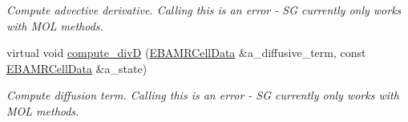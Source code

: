 \begin{DoxyCompactItemize}
\begin{DoxyCompactList}\small\item\em Compute advective derivative. Calling this is an error -\/ SG currently only works with M\+OL methods. \end{DoxyCompactList}\item 
virtual void \hyperlink{classcdr__sg_af01c3d0917c74904d53f73faa6892f57}{compute\+\_\+divD} (\hyperlink{type__definitions_8H_a7e610f301989e5e07781c5e338bdb7c3}{E\+B\+A\+M\+R\+Cell\+Data} \&a\+\_\+diffusive\+\_\+term, const \hyperlink{type__definitions_8H_a7e610f301989e5e07781c5e338bdb7c3}{E\+B\+A\+M\+R\+Cell\+Data} \&a\+\_\+state)
\begin{DoxyCompactList}\small\item\em Compute diffusion term. Calling this is an error -\/ SG currently only works with M\+OL methods. \end{DoxyCompactList}\end{DoxyCompactItemize}
